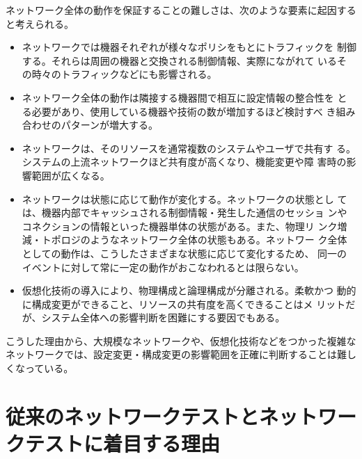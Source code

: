 ネットワーク全体の動作を保証することの難しさは、次のような要素に起因する
と考えられる。
\begin{itemize}
 \item ネットワークでは機器それぞれが様々なポリシをもとにトラフィックを
       制御する。それらは周囲の機器と交換される制御情報、実際にながれて
       いるその時々のトラフィックなどにも影響される。
 \item ネットワーク全体の動作は隣接する機器間で相互に設定情報の整合性を
       とる必要があり、使用している機器や技術の数が増加するほど検討すべ
       き組み合わせのパターンが増大する。
 \item ネットワークは、そのリソースを通常複数のシステムやユーザで共有す
       る。システムの上流ネットワークほど共有度が高くなり、機能変更や障
       害時の影響範囲が広くなる。
 \item ネットワークは状態に応じて動作が変化する。ネットワークの状態とし
       ては、機器内部でキャッシュされる制御情報・発生した通信のセッショ
       ンやコネクションの情報といった機器単体の状態がある。また、物理リ
       ンク増減・トポロジのようなネットワーク全体の状態もある。ネットワー
       ク全体としての動作は、こうしたさまざまな状態に応じて変化するため、
       同一のイベントに対して常に一定の動作がおこなわれるとは限らない。
 \item 仮想化技術の導入により、物理構成と論理構成が分離される。柔軟かつ
       動的に構成変更ができること、リソースの共有度を高くできることはメ
       リットだが、システム全体への影響判断を困難にする要因でもある。
\end{itemize}

こうした理由から、大規模なネットワークや、仮想化技術などをつかった複雑な
ネットワークでは、設定変更・構成変更の影響範囲を正確に判断することは難し
くなっている。

  \section{従来のネットワークテストとネットワークテストに着目する理由}



